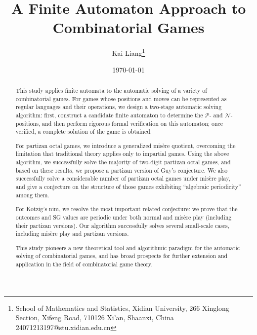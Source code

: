 \documentclass[11pt]{article}
\theoremstyle{definition}
\theoremstyle{plain}
\newcommand{\varP}{\mathcal{P}}
\newcommand{\varN}{\mathcal{N}}
\begin{document}
\title{A Finite Automaton Approach to Combinatorial Games}

\author{Kai Liang\thanks{School of Mathematics and Statistics, Xidian University, 266 Xinglong Section, Xifeng Road, 710126 Xi'an, Shaanxi, China \\ 24071213197@stu.xidian.edu.cn}}
\date{\today}
\maketitle

\begin{abstract}
    This study applies finite automata to the automatic solving of a variety of combinatorial games.
    For games whose positions and moves can be represented as regular languages and their operations,
    we design a two-stage automatic solving algorithm: first, construct a candidate finite automaton to determine the $\varP$- and $\varN$-positions, and then perform rigorous formal verification on this automaton; once verified, a complete solution of the game is obtained.

    For partizan octal games, we introduce a generalized misère quotient, overcoming the limitation that traditional theory applies only to impartial games.
    Using the above algorithm, we successfully solve the majority of two-digit partizan octal games, and based on these results, we propose a partizan version of Guy's conjecture.
    We also successfully solve a considerable number of partizan octal games under misère play, and give a conjecture on the structure of those games exhibiting ``algebraic periodicity'' among them.

    For Kotzig's nim, we resolve the most important related conjecture: we prove that the outcomes and SG values are periodic under both normal and misère play (including their partizan versions).
    Our algorithm successfully solves several small-scale cases, including misère play and partizan versions.

    This study pioneers a new theoretical tool and algorithmic paradigm for the automatic solving of combinatorial games, and has broad prospects for further extension and application in the field of combinatorial game theory.
\end{abstract}
\end{document}
